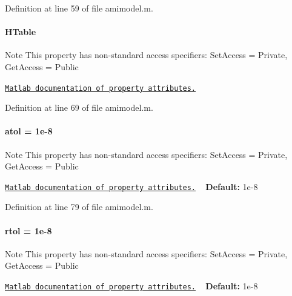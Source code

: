 Definition at line 59 of file amimodel.\+m.

\hypertarget{classamimodel_aafe6335df413dd688a2f44efba012cf1}{}
\paragraph[{H\+Table}]{\setlength{\rightskip}{0pt plus 5cm}H\+Table}\label{classamimodel_aafe6335df413dd688a2f44efba012cf1}
\begin{DoxyNote}{Note}
This property has non-\/standard access specifiers\+: {\ttfamily Set\+Access = Private, Get\+Access = Public} 

\href{http://www.mathworks.com/help/matlab/matlab_oop/property-attributes.html}{\tt Matlab documentation of property attributes.} 
\end{DoxyNote}


Definition at line 69 of file amimodel.\+m.

\hypertarget{classamimodel_a0c5f3dcf809a17b895fe12fc91272349}{}
\paragraph[{atol}]{\setlength{\rightskip}{0pt plus 5cm}atol = 1e-\/8}\label{classamimodel_a0c5f3dcf809a17b895fe12fc91272349}
\begin{DoxyNote}{Note}
This property has non-\/standard access specifiers\+: {\ttfamily Set\+Access = Private, Get\+Access = Public} 

\href{http://www.mathworks.com/help/matlab/matlab_oop/property-attributes.html}{\tt Matlab documentation of property attributes.} ~\newline
{\bfseries Default\+:} 1e-\/8 
\end{DoxyNote}


Definition at line 79 of file amimodel.\+m.

\hypertarget{classamimodel_a7978e9a4674f869e6b2950e2f6262ca5}{}
\paragraph[{rtol}]{\setlength{\rightskip}{0pt plus 5cm}rtol = 1e-\/8}\label{classamimodel_a7978e9a4674f869e6b2950e2f6262ca5}
\begin{DoxyNote}{Note}
This property has non-\/standard access specifiers\+: {\ttfamily Set\+Access = Private, Get\+Access = Public} 

\href{http://www.mathworks.com/help/matlab/matlab_oop/property-attributes.html}{\tt Matlab documentation of property attributes.} ~\newline
{\bfseries Default\+:} 1e-\/8 
\end{DoxyNote}


